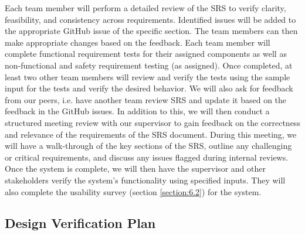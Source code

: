 \documentclass[12pt, titlepage]{article}
\begin{document}
Each team member will perform a detailed review of the SRS to verify clarity, feasibility, and consistency across requirements. Identified issues will be added to the appropriate GitHub issue of the specific section. The team members can then make appropriate changes based on the feedback. Each team member will complete functional requirement tests for their assigned components as well as non-functional and safety requirement testing (as assigned). Once completed, at least two other team members will review and verify the tests using the sample input for the tests and verify the desired behavior. We will also ask for feedback from our peers, i.e. have another team review SRS and update it based on the feedback in the GitHub issues. 
In addition to this, we will then conduct a structured meeting review with our supervisor to gain feedback on the correctness and relevance of the requirements of the SRS document. During this meeting, we will have a walk-through of the key sections of the SRS, outline any challenging or critical requirements, and discuss any issues flagged during internal reviews. 
Once the system is complete, we will then have the supervisor and other stakeholders verify the system's functionality using specified inputs. They will also complete the usability survey (section \ref{section:6.2}) for the system.


\subsection{Design Verification Plan} \label{section:3.3}
\end{document}
